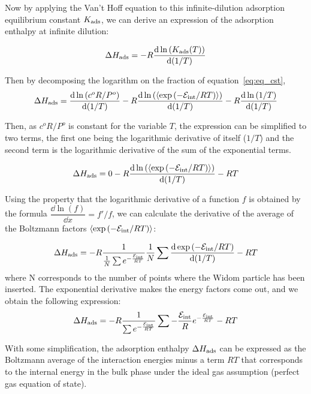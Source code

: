 \documentclass[main.tex]{subfiles}
\begin{document}
Now by applying the Van't Hoff equation to this infinite-dilution adsorption equilibrium constant $K_{\text{ads}}$, we can derive an expression of the adsorption enthalpy at infinite dilution:

\begin{equation}
  \Delta H_{\text{ads}} = -R\dfrac{\mathop{}\mathopen{}\mathrm{d} \ln\left(K_{\text{ads}}(T)\right)}{\mathop{}\mathopen{}\mathrm{d} (1/T)}
\end{equation}

Then by decomposing the logarithm on the fraction of equation~\ref{eq:eq_cst}, 
\begin{equation}
  \Delta H_{\text{ads}} = \dfrac{\mathop{}\mathopen{}\mathrm{d} \ln\left(c^o R/P^o\right)}{\mathop{}\mathopen{}\mathrm{d} (1/T)} - R\dfrac{\mathop{}\mathopen{}\mathrm{d} \ln\left(\langle \exp\left(-\mathcal{E}_{\text{int}}/RT\right) \rangle\right)}{\mathop{}\mathopen{}\mathrm{d} (1/T)} - R\dfrac{\mathop{}\mathopen{}\mathrm{d} \ln\left(1/T\right)}{\mathop{}\mathopen{}\mathrm{d} (1/T)}
\end{equation}

Then, as $c^o R/P^o$ is constant for the variable $T$, the expression can be simplified to two terms, the first one being the logarithmic derivative of itself ($1/T$) and the second term is the logarithmic derivative of the sum of the exponential terms. 

\begin{equation}
  \Delta H_{\text{ads}} = 0 - R\dfrac{\mathop{}\mathopen{}\mathrm{d} \ln\left(\langle \exp\left(-\mathcal{E}_{\text{int}}/RT\right) \rangle\right)}{\mathop{}\mathopen{}\mathrm{d} (1/T)} - RT
\end{equation}

Using the property that the logarithmic derivative of a function $f$ is obtained by the formula $\dfrac{\dd \ln\left(f\right)}{\dd x}=f'/f$, we can calculate the derivative of the average of the Boltzmann factors $\langle \exp\left(-\mathcal{E}_{\text{int}}/RT\right) \rangle$:

\begin{equation}
  \Delta H_{\text{ads}} = -R\dfrac{1}{\frac{1}{N}\sum e^{-\frac{\mathcal{E}_{\text{int}}}{RT}}} \frac{1}{N}\sum \dfrac{\mathop{}\mathopen{}\mathrm{d} \exp\left(-\mathcal{E}_{\text{int}}/RT\right)}{\mathop{}\mathopen{}\mathrm{d} (1/T)} - RT
\end{equation}
where N corresponds to the number of points where the Widom particle has been inserted.
The exponential derivative makes the energy factors come out, and we obtain the following expression:
\begin{equation}
  \Delta H_{\text{ads}} = -R\dfrac{1}{\sum e^{-\frac{\mathcal{E}_{\text{int}}}{RT}}} \sum - \frac{\mathcal{E}_{\text{int}}}{R} e^{-\frac{\mathcal{E}_{\text{int}}}{RT}} - RT
\end{equation}

With some simplification, the adsorption enthalpy $\Delta H_{\text{ads}}$ can be expressed as the Boltzmann average of the interaction energies minus a term $RT$ that corresponds to the internal energy in the bulk phase under the ideal gas assumption (perfect gas equation of state).
\end{document}
